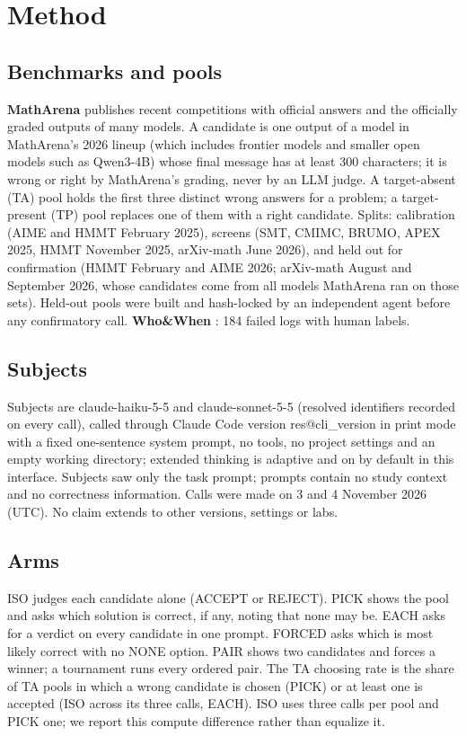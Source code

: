 \documentclass[10pt,twocolumn]{article}
\makeatletter
\newcommand{\res}[1]{\csname res@#1\endcsname}
\makeatother
\begin{document}
\section{Method}
\subsection{Benchmarks and pools}
\textbf{MathArena} \citep{balunovic2025matharena} publishes recent competitions with official answers and the officially graded outputs of many models. A candidate is one output of a model in MathArena's 2026 lineup (which includes frontier models and smaller open models such as Qwen3-4B) whose final message has at least 300 characters; it is wrong or right by MathArena's grading, never by an LLM judge. A target-absent (TA) pool holds the first three distinct wrong answers for a problem; a target-present (TP) pool replaces one of them with a right candidate. Splits: calibration (AIME and HMMT February 2025), screens (SMT, CMIMC, BRUMO, APEX 2025, HMMT November 2025, arXiv-math June 2026), and held out for confirmation (HMMT February and AIME 2026; arXiv-math August and September 2026, whose candidates come from all models MathArena ran on those sets). Held-out pools were built and hash-locked by an independent agent before any confirmatory call. \textbf{Who\&When} \citep{zhang2025which}: 184 failed logs with human labels.

\subsection{Subjects}
Subjects are claude-haiku-5-5 and claude-sonnet-5-5 (resolved identifiers recorded on every call), called through Claude Code version \res{cli_version} in print mode with a fixed one-sentence system prompt, no tools, no project settings and an empty working directory; extended thinking is adaptive and on by default in this interface. Subjects saw only the task prompt; prompts contain no study context and no correctness information. Calls were made on 3 and 4 November 2026 (UTC). No claim extends to other versions, settings or labs.

\subsection{Arms}
ISO judges each candidate alone (ACCEPT or REJECT). PICK shows the pool and asks which solution is correct, if any, noting that none may be. EACH asks for a verdict on every candidate in one prompt. FORCED asks which is most likely correct with no NONE option. PAIR shows two candidates and forces a winner; a tournament runs every ordered pair. The TA choosing rate is the share of TA pools in which a wrong candidate is chosen (PICK) or at least one is accepted (ISO across its three calls, EACH). ISO uses three calls per pool and PICK one; we report this compute difference rather than equalize it.
\end{document}
